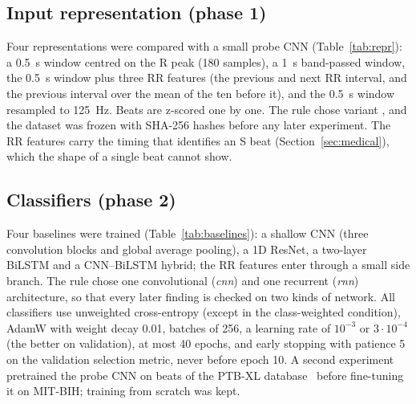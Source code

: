 \documentclass[11pt]{article}
\begin{document}
\subsection{Input representation (phase 1)}
Four representations were compared with a small probe CNN (Table~\ref{tab:repr}): a 0.5~s window centred on the R peak (180 samples), a
1~s band-passed window, the 0.5~s window plus three RR features (the previous and next RR interval, and the previous interval over the
mean of the ten before it), and the 0.5~s window resampled to 125~Hz. Beats are z-scored one by one. The rule chose variant
\PhaseOneWinner, and the dataset was frozen with SHA-256 hashes before any later experiment. The RR features carry the timing that
identifies an S beat (Section~\ref{sec:medical}), which the shape of a single beat cannot show.
\begin{table}[htbp]\centering\small{}\caption{Input
representations (validation, probe CNN).}\label{tab:repr}\end{table}

\subsection{Classifiers (phase 2)}
Four baselines were trained (Table~\ref{tab:baselines}): a shallow CNN (three convolution blocks and global
average pooling), a 1D ResNet, a two-layer BiLSTM and a CNN--BiLSTM hybrid; the RR features enter through a small side branch. The rule
chose one convolutional (\emph{cnn}) and one recurrent (\emph{rnn}) architecture, so that every later finding is checked on two kinds of
network. All classifiers use unweighted cross-entropy (except in the class-weighted condition), AdamW with weight decay 0.01, batches of
256, a learning rate of $10^{-3}$ or $3\cdot10^{-4}$ (the better on validation), at most 40 epochs, and early stopping with patience 5 on
the validation selection metric, never before epoch 10. A second experiment pretrained the probe CNN on beats of the PTB-XL
database~\cite{wagner2020ptbxl} before fine-tuning it on MIT-BIH; training from scratch was kept.
\begin{table}[htbp]\centering\small{}\caption{Baseline
classifiers (validation).}\label{tab:baselines}\end{table}
\end{document}
